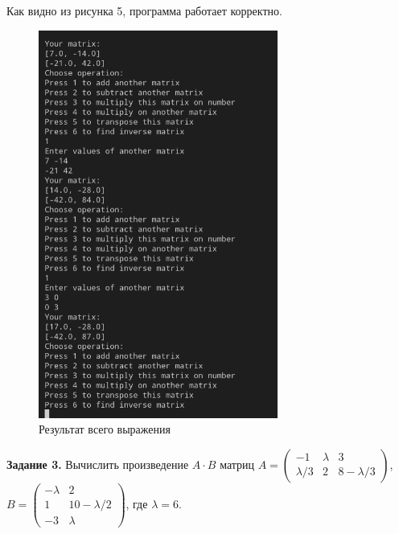 \documentclass[bachelor, och, labwork]{shiza}
\begin{document}
        Как видно из рисунка 5, программа работает корректно.
        \begin{figure}[H]
            \centering
            \includegraphics[width=0.7\textwidth]{photo/5.png}
            \caption{Результат всего выражения}
        \end{figure} 

        \textbf{Задание 3.} Вычислить произведение $A \cdot B$ матриц 
        $A =
        \begin{pmatrix}
            -1 & \lambda & 3  \\
            \lambda / 3 & 2 & 8 - \lambda / 3
        \end{pmatrix}$, 
        $B =
        \begin{pmatrix}
            -\lambda & 2 \\
            1 & 10 - \lambda / 2 \\
            -3 & \lambda
        \end{pmatrix}$, где $\lambda = 6$. 
\end{document}
